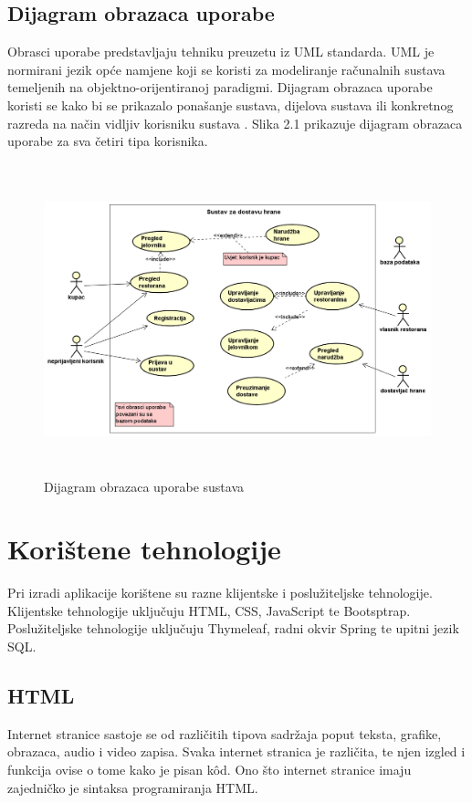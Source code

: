 \documentclass[times, utf8, zavrsni, numeric]{fer}
\begin{document}
\subsection{Dijagram obrazaca uporabe }
Obrasci uporabe predstavljaju tehniku preuzetu iz UML  standarda. UML je normirani jezik opće namjene koji se koristi za modeliranje računalnih sustava temeljenih na objektno-orijentiranoj paradigmi. Dijagram obrazaca uporabe koristi se kako bi se prikazalo ponašanje sustava, dijelova sustava ili konkretnog razreda na način vidljiv korisniku sustava \cite{UMLdijag64:online}. Slika 2.1  prikazuje  dijagram obrazaca uporabe za sva četiri tipa korisnika.
\begin{figure}[htb]
\centering
\includegraphics[height=9.0cm]{fds-useCase.png}
\caption{Dijagram obrazaca uporabe sustava}
\label{fig:use-case}
\end{figure}
\section{Korištene tehnologije}
Pri izradi aplikacije korištene su razne klijentske i poslužiteljske tehnologije. Klijentske tehnologije uključuju HTML, CSS, JavaScript te Bootsptrap. Poslužiteljske tehnologije uključuju Thymeleaf, radni okvir Spring te upitni jezik SQL.
\subsection{HTML}
Internet stranice sastoje se od različitih tipova sadržaja poput teksta, grafike, obrazaca, audio i video zapisa. Svaka internet stranica je različita, te njen izgled i funkcija ovise o tome kako je pisan kôd. Ono što internet stranice imaju zajedničko je sintaksa programiranja HTML.
\end{document}
